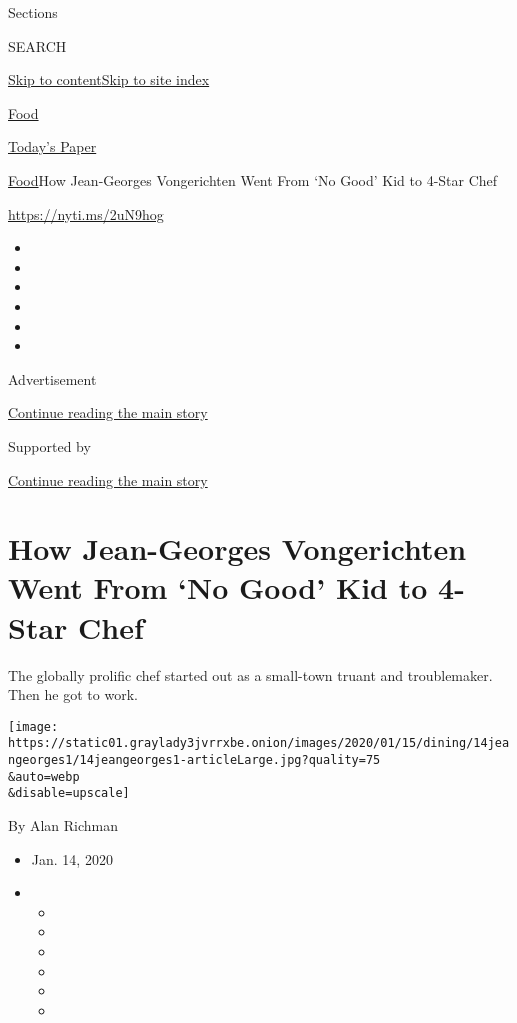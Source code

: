 Sections

SEARCH

\protect\hyperlink{site-content}{Skip to
content}\protect\hyperlink{site-index}{Skip to site index}

\href{https://www.nytimes3xbfgragh.onion/section/food}{Food}

\href{https://myaccount.nytimes3xbfgragh.onion/auth/login?response_type=cookie\&client_id=vi}{}

\href{https://www.nytimes3xbfgragh.onion/section/todayspaper}{Today's
Paper}

\href{/section/food}{Food}\textbar{}How Jean-Georges Vongerichten Went
From `No Good' Kid to 4-Star Chef

\url{https://nyti.ms/2uN9hog}

\begin{itemize}
\item
\item
\item
\item
\item
\item
\end{itemize}

Advertisement

\protect\hyperlink{after-top}{Continue reading the main story}

Supported by

\protect\hyperlink{after-sponsor}{Continue reading the main story}

\hypertarget{how-jean-georges-vongerichten-went-from-no-good-kid-to-4-star-chef}{%
\section{How Jean-Georges Vongerichten Went From `No Good' Kid to 4-Star
Chef}\label{how-jean-georges-vongerichten-went-from-no-good-kid-to-4-star-chef}}

The globally prolific chef started out as a small-town truant and
troublemaker. Then he got to work.

\texttt{[image: https://static01.graylady3jvrrxbe.onion/images/2020/01/15/dining/14jeangeorges1/14jeangeorges1-articleLarge.jpg?quality=75\\\&auto=webp\\\&disable=upscale]}

By Alan Richman

\begin{itemize}
\item
  Jan. 14, 2020
\item
  \begin{itemize}
  \item
  \item
  \item
  \item
  \item
  \item
  \end{itemize}
\end{itemize}

